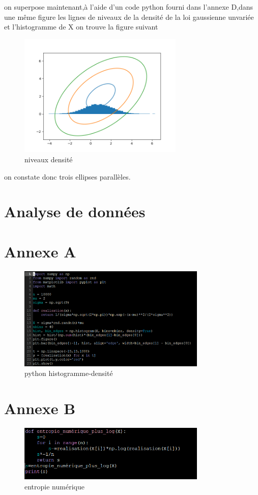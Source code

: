 \documentclass[a4paper]{article}
\begin{document}
on superpose maintenant,à l'aide d'un code python fourni dans l'annexe D,dans une même figure les lignes de niveaux de la densité de la loi gaussienne unvariée et l'histogramme de X on trouve la figure suivant
\begin{figure}[h]
  \centering
  \includegraphics[width=0.7\textwidth]{7.png}
  \caption{niveaux densité}
\end{figure}
on constate donc trois ellipses parallèles.
\section{Analyse de données}
\newpage
\appendix
\section{Annexe A}
\begin{figure}[h]
  \centering
  \includegraphics[width=0.8\textwidth]{1.png}
  \caption{python histogramme-densité}
\end{figure}

\section{Annexe B}
\begin{figure}[h]
  \centering
  \includegraphics[width=0.8\textwidth]{4.png}
  \caption{entropie numérique}
\end{figure}
\end{document}
